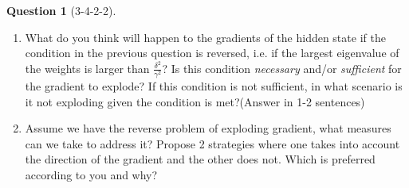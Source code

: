\documentclass[12pt]{article}
\newif\ifsolution
\theoremstyle{definition}
\newtheorem{exercise}{Question}%
\newtheorem{answer}{Answer} %
\newcommand{\Answer}[1]{
\ifsolution\color{answer}\begin{answer}#1\end{answer}\fi
}
\newif\ifsolution
\begin{document}
\begin{exercise} [3-4-2-2]
\begin{enumerate}[label=\arabic{exercise}.\arabic*]
        \item What do you think will happen to the gradients of the hidden state if the condition in the previous question is reversed, i.e. if the largest eigenvalue of the weights is larger than $\frac{\delta^2}{\gamma^2}$? 
        Is this condition \textit{necessary} and/or \textit{sufficient} for the gradient to explode? If this condition is not sufficient, in what scenario is it not exploding given the condition is met?(Answer in 1-2 sentences)
        \item Assume we have the reverse problem of exploding gradient, what measures can we take to address it? Propose 2 strategies where one takes into account the direction of the gradient and the other does not. Which is preferred according to you and why?
    \end{enumerate}
    \vspace{0.4cm}
    \Answer{
    }
\end{exercise}
\end{document}
